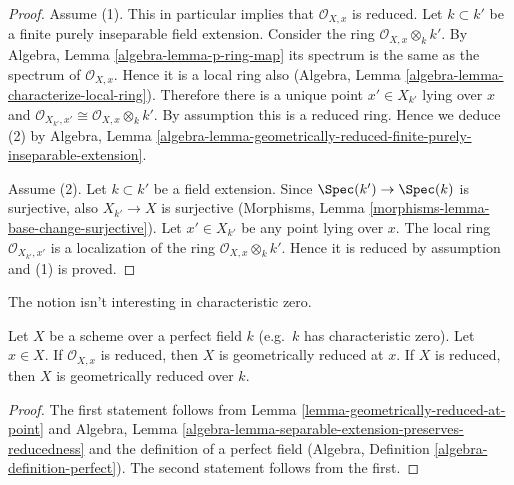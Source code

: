 \begin{proof}
Assume (1). This in particular implies that $\mathcal{O}_{X, x}$
is reduced. Let $k \subset k'$ be a finite purely inseparable field
extension. Consider the ring $\mathcal{O}_{X, x} \otimes_k k'$.
By Algebra, Lemma \ref{algebra-lemma-p-ring-map}
its spectrum is the same as the spectrum of $\mathcal{O}_{X, x}$.
Hence it is a local ring also
(Algebra, Lemma \ref{algebra-lemma-characterize-local-ring}).
Therefore there is a unique point $x' \in X_{k'}$ lying over $x$
and $\mathcal{O}_{X_{k'}, x'} \cong \mathcal{O}_{X, x} \otimes_k k'$.
By assumption this is a reduced ring. Hence we deduce (2) by
Algebra, Lemma
\ref{algebra-lemma-geometrically-reduced-finite-purely-inseparable-extension}.

\medskip\noindent
Assume (2). Let $k \subset k'$ be a field extension. Since
$\Spec(k') \to \Spec(k)$ is surjective, also
$X_{k'} \to X$ is surjective
(Morphisms, Lemma \ref{morphisms-lemma-base-change-surjective}).
Let $x' \in X_{k'}$ be any point lying over $x$.
The local ring $\mathcal{O}_{X_{k'}, x'}$
is a localization of the ring $\mathcal{O}_{X, x} \otimes_k k'$.
Hence it is reduced by assumption and (1) is proved.
\end{proof}

\noindent
The notion isn't interesting in characteristic zero.

\begin{lemma}
\label{lemma-perfect-reduced}
Let $X$ be a scheme over a perfect field $k$ (e.g.\ $k$ has
characteristic zero). Let $x \in X$. If $\mathcal{O}_{X, x}$ is
reduced, then $X$ is geometrically reduced at $x$.
If $X$ is reduced, then $X$ is geometrically reduced over $k$.
\end{lemma}

\begin{proof}
The first statement follows from
Lemma \ref{lemma-geometrically-reduced-at-point} and
Algebra, Lemma \ref{algebra-lemma-separable-extension-preserves-reducedness}
and the definition of a perfect field
(Algebra, Definition \ref{algebra-definition-perfect}).
The second statement follows from the first.
\end{proof}

